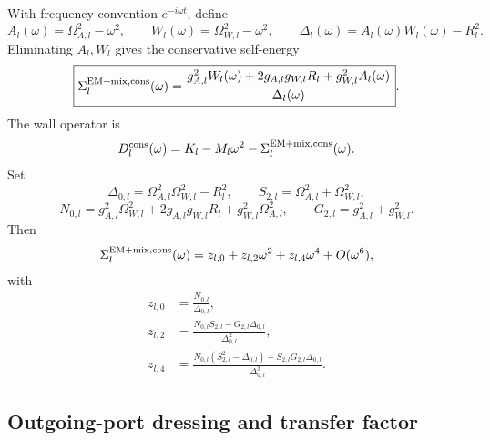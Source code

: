 With frequency convention \(e^{-i\omega t}\), define
\begin{equation}
A_l(\omega)=\Omega_{A,l}^2-\omega^2,
\qquad
W_l(\omega)=\Omega_{W,l}^2-\omega^2,
\qquad
\Delta_l(\omega)=A_l(\omega)W_l(\omega)-R_l^2.
\end{equation}
Eliminating \(A_l,W_l\) gives the conservative self-energy
\begin{equation}
\label{eq:part01-sigma-cons}
\boxed{
\Sigma_l^{\rm EM+mix,cons}(\omega)
=
\frac{g_{A,l}^2W_l(\omega)+2g_{A,l}g_{W,l}R_l+g_{W,l}^2A_l(\omega)}
{\Delta_l(\omega)}}.
\end{equation}
The wall operator is
\begin{equation}
D_l^{\rm cons}(\omega)=K_l-M_l\omega^2-\Sigma_l^{\rm EM+mix,cons}(\omega).
\end{equation}
Set
\begin{equation}
\Delta_{0,l}=\Omega_{A,l}^2\Omega_{W,l}^2-R_l^2,
\qquad
S_{2,l}=\Omega_{A,l}^2+\Omega_{W,l}^2,
\end{equation}
\begin{equation}
N_{0,l}=g_{A,l}^2\Omega_{W,l}^2+2g_{A,l}g_{W,l}R_l+g_{W,l}^2\Omega_{A,l}^2,
\qquad
G_{2,l}=g_{A,l}^2+g_{W,l}^2.
\end{equation}
Then
\begin{equation}
\Sigma_l^{\rm EM+mix,cons}(\omega)
=
z_{l,0}+z_{l,2}\omega^2+z_{l,4}\omega^4+O(\omega^6),
\end{equation}
with
\begin{equation}
\label{eq:part01-z-coeffs}
\boxed{
\begin{aligned}
z_{l,0}&=\frac{N_{0,l}}{\Delta_{0,l}},\\
z_{l,2}&=\frac{N_{0,l}S_{2,l}-G_{2,l}\Delta_{0,l}}{\Delta_{0,l}^2},\\
z_{l,4}&=\frac{N_{0,l}(S_{2,l}^2-\Delta_{0,l})-S_{2,l}G_{2,l}\Delta_{0,l}}{\Delta_{0,l}^3}.
\end{aligned}
}
\end{equation}

\subsection{Outgoing-port dressing and transfer factor}
\label{subsec:part01-outgoing-port-dressing}

